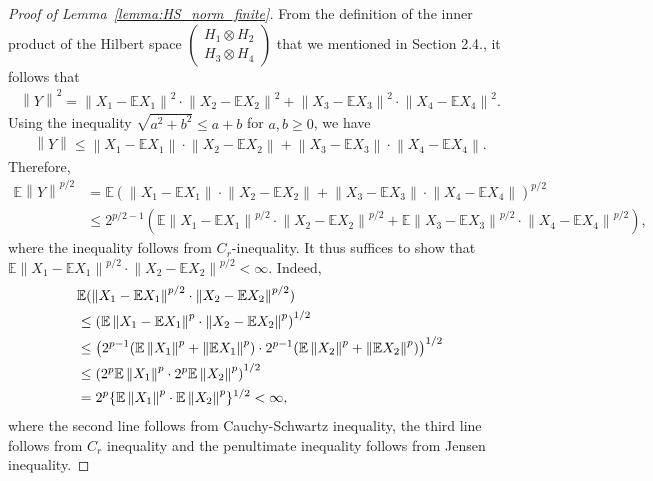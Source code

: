 \documentclass[10pt,a4paper]{amsart}
\newcommand{\bE}{\mathbb{E}}
\begin{document}
\begin{proof}[Proof of Lemma~\ref{lemma:HS_norm_finite}]
From the definition of the inner product of the Hilbert space  $\begin{pmatrix}
       H_1\otimes  H_2\\
       H_3\otimes  H_4
    \end{pmatrix}$ that we mentioned in Section 2.4., it follows that
\begin{align*}
    \left\|Y\right\|^2= \left\|X_1-\bE X_1\right\|^2\cdot \left\|X_2-\bE X_2\right\|^2+\left\|X_3-\bE X_3\right\|^2\cdot \left\|X_4-\bE X_4\right\|^2.
 \end{align*}
 Using the inequality $\sqrt{a^2+b^2}\leq a+b$ for $a,b\geq 0$, we have 
 \begin{align*}
     \left\|Y\right\|\leq \left\|X_1-\bE X_1\right\|\cdot \left\|X_2-\bE X_2\right\|+\left\|X_3-\bE X_3\right\|\cdot \left\|X_4-\bE X_4\right\|.
 \end{align*}
    Therefore,
    \begin{align*}
        \bE \left\|Y\right\|^{p/2}&=\bE\left(\left\|X_1-\bE X_1\right\|\cdot \left\|X_2-\bE X_2\right\|+\left\|X_3-\bE X_3\right\|\cdot \left\|X_4-\bE X_4\right\|\right)^{p/2}\\
        &\leq 2^{p/2-1}\left(\bE\left\|X_1-\bE X_1\right\|^{p/2}\cdot \left\|X_2-\bE X_2\right\|^{p/2}+\bE\left\|X_3-\bE X_3\right\|^{p/2}\cdot \left\|X_4-\bE X_4\right\|^{p/2}\right),
    \end{align*}
    where the inequality follows from $C_r$-inequality. It thus suffices to show that $\bE\left\|X_1-\bE X_1\right\|^{p/2}\cdot \left\|X_2-\bE X_2\right\|^{p/2}<\infty.$ Indeed,
    \begin{align*}
         &\bE (\left\|X_1-\bE X_1\right\|^{p/2}\cdot \left\|X_2-\bE X_2\right\|^{p/2})\\
         &\leq \left(\bE \left\|X_1-\bE X_1\right\|^{p}\cdot \left\|X_2-\bE X_2\right\|^{p}\right)^{1/2}\allowdisplaybreaks\\
         &\leq \left(2^{p-1}(\bE \left\|X_1\right\|^p+\left\|\bE X_1\right\|^p)\cdot 2^{p-1}(\bE \left\|X_2\right\|^p+\left\|\bE X_2\right\|^p)\right)^{1/2}\\
         &\leq \left(2^p \bE \left\|X_1\right\|^p \cdot 2^p \bE \left\|X_2\right\|^p\right)^{1/2}\\
         &=2^p \{\bE\left\|X_1\right\|^p \cdot \bE \left\|X_2\right\|^p\}^{1/2}<\infty,
    \end{align*}
    where the second line follows from Cauchy-Schwartz inequality, the third line follows from $C_r$ inequality and the penultimate inequality follows from Jensen inequality.
\end{proof}
\end{document}
